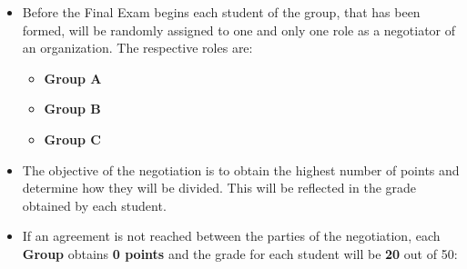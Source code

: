 \documentclass[
  ignorenonframetext,
]{beamer}
\providecommand{\tightlist}{%
  \setlength{\itemsep}{0pt}\setlength{\parskip}{0pt}}\usepackage{longtable,booktabs,array}
\begin{document}
\begin{frame}{}
\label{section-4}
\begin{itemize}
\item
  Before the Final Exam begins each student of the group, that has been
  formed, will be randomly assigned to one and only one role as a
  negotiator of an organization. The respective roles are:

  \begin{itemize}
  \tightlist
  \item
    \textbf{Group A}
  \item
    \textbf{Group B}
  \item
    \textbf{Group C}
  \end{itemize}
\item
  The objective of the negotiation is to obtain the highest number of
  points and determine how they will be divided. This will be reflected
  in the grade obtained by each student.
\end{itemize}
\end{frame}

\begin{frame}{}
\label{section-5}
\begin{itemize}
\tightlist
\item
  If an agreement is not reached between the parties of the negotiation,
  each \textbf{Group} obtains \textbf{0 points} and the grade for each
  student will be \textbf{20} out of 50:
\end{itemize}

\begin{table}

\caption{\label{tbl-no-agreement}Results in case of no agreement}


\end{table}%
\end{frame}
\end{document}
